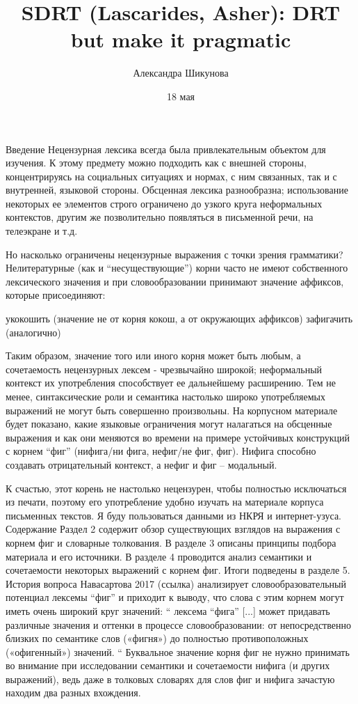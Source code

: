 \documentclass{article}
\title{\textbf{SDRT (Lascarides, Asher): }DRT but make it pragmatic}
\author{Александра Шикунова}
\date{18 мая}
\begin{document}
\maketitle

Введение
Нецензурная лексика всегда была привлекательным объектом для изучения. К этому предмету можно подходить как с внешней стороны, концентрируясь на социальных ситуациях и нормах, с ним связанных, так и с внутренней, языковой стороны.  Обсценная лексика разнообразна; использование некоторых ее элементов строго ограничено до узкого круга неформальных контекстов, другим же позволительно появляться в письменной речи, на телеэкране и т.д.

Но насколько ограничены нецензурные выражения с точки зрения грамматики? Нелитературные (как и “несуществующие”) корни часто не имеют собственного лексического значения и при словообразовании принимают значение аффиксов, которые присоединяют:

укокошить (значение не от корня кокош, а от окружающих аффиксов)
зафигачить (аналогично)

Таким образом, значение того или иного корня может быть любым, а сочетаемость нецензурных лексем - чрезвычайно широкой; неформальный контекст их употребления способствует ее дальнейшему расширению. Тем не менее, синтаксические роли и семантика настолько широко употребляемых выражений не могут быть совершенно произвольны. На корпусном материале будет показано, какие языковые ограничения могут налагаться на обсценные выражения и как они меняются во времени на примере устойчивых конструкций с корнем “фиг” (нифига/ни фига, нефиг/не фиг, фиг). Нифига способно создавать отрицательный контекст, а нефиг и фиг -- модальный.

К счастью, этот корень не настолько нецензурен, чтобы полностью исключаться из печати, поэтому его употребление удобно изучать на материале корпуса письменных текстов. Я буду пользоваться данными из НКРЯ и интернет-узуса.
Содержание
Раздел 2 содержит обзор существующих взглядов на выражения с корнем фиг и словарные толкования. В разделе 3 описаны принципы подбора материала и его источники. В разделе 4 проводится анализ семантики и сочетаемости некоторых выражений с корнем фиг. Итоги подведены в разделе 5.
История вопроса
Навасартова 2017 (ссылка) анализирует словообразовательный потенциал лексемы “фиг” и приходит к выводу, что слова с этим корнем могут иметь очень широкий круг значений:
“
лексема “фига” [...] может придавать различные значения и оттенки в процессе  словообразовании: от непосредственно близких по семантике слов («фигня») до полностью противоположных («офигенный») значений. 
“
Буквальное значение корня фиг не нужно принимать во внимание при исследовании семантики и сочетаемости нифига (и других выражений), ведь даже в толковых словарях для слов фиг и нифига зачастую находим два разных вхождения.
\end{document}
